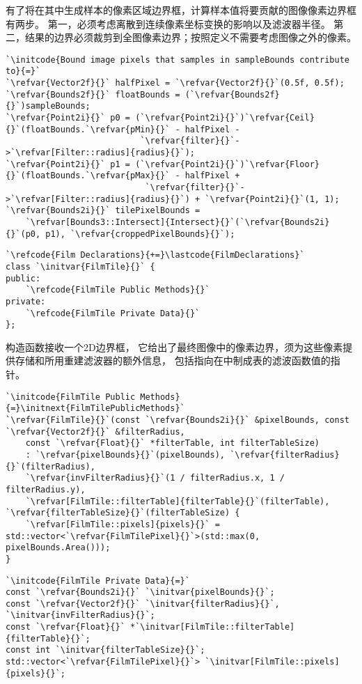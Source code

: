 有了将在其中生成样本的像素区域边界框，计算样本值将要贡献的图像像素边界框有两步。
第一，必须考虑离散到连续像素坐标变换的影响以及滤波器半径。
第二，结果的边界必须裁剪到全图像素边界；按照定义不需要考虑图像之外的像素。
\begin{lstlisting}
`\initcode{Bound image pixels that samples in sampleBounds contribute to}{=}`
`\refvar{Vector2f}{}` halfPixel = `\refvar{Vector2f}{}`(0.5f, 0.5f);
`\refvar{Bounds2f}{}` floatBounds = (`\refvar{Bounds2f}{}`)sampleBounds;
`\refvar{Point2i}{}` p0 = (`\refvar{Point2i}{}`)`\refvar{Ceil}{}`(floatBounds.`\refvar{pMin}{}` - halfPixel -
                           `\refvar{filter}{}`->`\refvar[Filter::radius]{radius}{}`);
`\refvar{Point2i}{}` p1 = (`\refvar{Point2i}{}`)`\refvar{Floor}{}`(floatBounds.`\refvar{pMax}{}` - halfPixel +
                            `\refvar{filter}{}`->`\refvar[Filter::radius]{radius}{}`) + `\refvar{Point2i}{}`(1, 1);
`\refvar{Bounds2i}{}` tilePixelBounds =
    `\refvar[Bounds3::Intersect]{Intersect}{}`(`\refvar{Bounds2i}{}`(p0, p1), `\refvar{croppedPixelBounds}{}`);
\end{lstlisting}
\begin{lstlisting}
`\refcode{Film Declarations}{+=}\lastcode{FilmDeclarations}`
class `\initvar{FilmTile}{}` {
public:
    `\refcode{FilmTile Public Methods}{}`
private:
    `\refcode{FilmTile Private Data}{}`
};
\end{lstlisting}

构造函数接收一个2D边界框，
它给出了最终图像中的像素边界，须为这些像素提供存储和所用重建滤波器的额外信息，
包括指向在{}中制成表的滤波函数值的指针。
\begin{lstlisting}
`\initcode{FilmTile Public Methods}{=}\initnext{FilmTilePublicMethods}`
`\refvar{FilmTile}{}`(const `\refvar{Bounds2i}{}` &pixelBounds, const `\refvar{Vector2f}{}` &filterRadius,
    const `\refvar{Float}{}` *filterTable, int filterTableSize)
    : `\refvar{pixelBounds}{}`(pixelBounds), `\refvar{filterRadius}{}`(filterRadius),
    `\refvar{invFilterRadius}{}`(1 / filterRadius.x, 1 / filterRadius.y),
    `\refvar[FilmTile::filterTable]{filterTable}{}`(filterTable), `\refvar{filterTableSize}{}`(filterTableSize) {
    `\refvar[FilmTile::pixels]{pixels}{}` = std::vector<`\refvar{FilmTilePixel}{}`>(std::max(0, pixelBounds.Area()));
}
\end{lstlisting}

\begin{lstlisting}
`\initcode{FilmTile Private Data}{=}`
const `\refvar{Bounds2i}{}` `\initvar{pixelBounds}{}`;
const `\refvar{Vector2f}{}` `\initvar{filterRadius}{}`, `\initvar{invFilterRadius}{}`;
const `\refvar{Float}{}` *`\initvar[FilmTile::filterTable]{filterTable}{}`;
const int `\initvar{filterTableSize}{}`;
std::vector<`\refvar{FilmTilePixel}{}`> `\initvar[FilmTile::pixels]{pixels}{}`;
\end{lstlisting}

